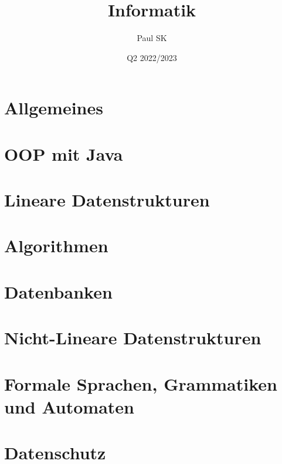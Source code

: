 \documentclass{article}
\title{Informatik}
\date{Q2 2022/2023}
\author{Paul SK}
\begin{document}
	\maketitle
	\newpage


	\section{Allgemeines}

	\section{OOP mit Java}

	\section{Lineare Datenstrukturen}

	\section{Algorithmen}

	\section{Datenbanken}

	\section{Nicht-Lineare Datenstrukturen}

	\section{Formale Sprachen, Grammatiken und Automaten}

	\section{Datenschutz}
\end{document}
